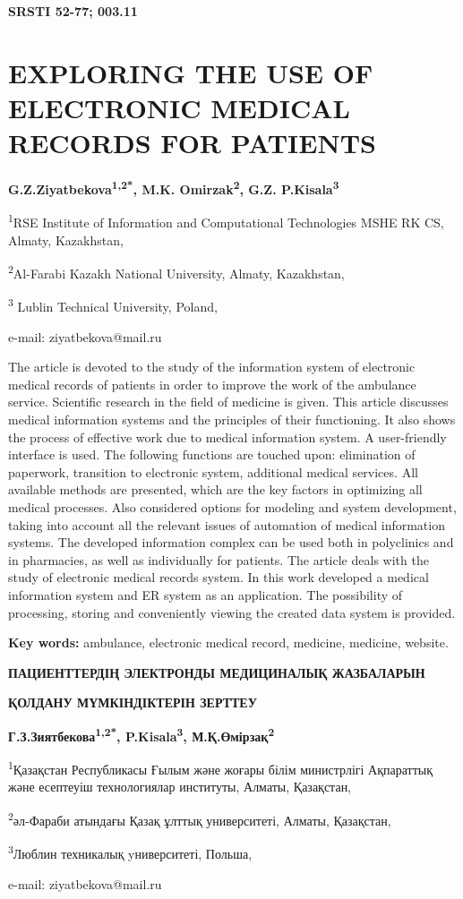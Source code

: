 \clearpage
{\bfseries SRSTI 52-77; 003.11}

\section{EXPLORING THE USE OF ELECTRONIC MEDICAL RECORDS FOR PATIENTS}
\begin{center}
{\bfseries G.Z.Ziyatbekova\textsuperscript{1,2*}, M.K.
Omirzak\textsuperscript{2}, G.Z. P.Kisala\textsuperscript{3}}

\textsuperscript{1}RSE Institute of Information and Computational
Technologies MSHE RK CS, Almaty, Kazakhstan,

\textsuperscript{2}Al-Farabi Kazakh National University, Almaty,
Kazakhstan,

\textsuperscript{3} Lublin Technical University,
Poland,

e-mail: ziyatbekova@mail.ru
\end{center}

The article is devoted to the study of the
information system of electronic medical records of patients in order to
improve the work of the ambulance service. Scientific research in the
field of medicine is given. This article discusses medical information
systems and the principles of their functioning. It also shows the
process of effective work due to medical information system. A
user-friendly interface is used. The following functions are touched
upon: elimination of paperwork, transition to electronic system,
additional medical services. All available methods are presented, which
are the key factors in optimizing all medical processes. Also considered
options for modeling and system development, taking into account all the
relevant issues of automation of medical information systems. The
developed information complex can be used both in polyclinics and in
pharmacies, as well as individually for patients. The article deals with
the study of electronic medical records system. In this work developed a
medical information system and ER system as an application. The
possibility of processing, storing and conveniently viewing the created
data system is provided.

{\bfseries Key words:} ambulance, electronic medical record, medicine,
medicine, website.

\begin{center}
{\large\bfseries ПАЦИЕНТТЕРДІҢ ЭЛЕКТРОНДЫ МЕДИЦИНАЛЫҚ ЖАЗБАЛАРЫН}

\vspace{1em}
{\bfseries ҚОЛДАНУ МҮМКІНДІКТЕРІН ЗЕРТТЕУ}

{\bfseries Г.З.Зиятбекова\textsuperscript{1,2*},
P.Kisala\textsuperscript{3}, М.Қ.Өмірзақ\textsuperscript{2}}

\textsuperscript{1}Қазақстан Республикасы Ғылым және жоғары білім
министрлігі Ақпараттық және есептеуіш технологиялар институты, Алматы,
Қазақстан,

\textsuperscript{2}әл-Фараби атындағы Қазақ ұлттық университеті, Алматы, Қазақстан,

\textsuperscript{3}Люблин техникалық yниверситеті, Польша,

e-mail: ziyatbekova@mail.ru
\end{center}

